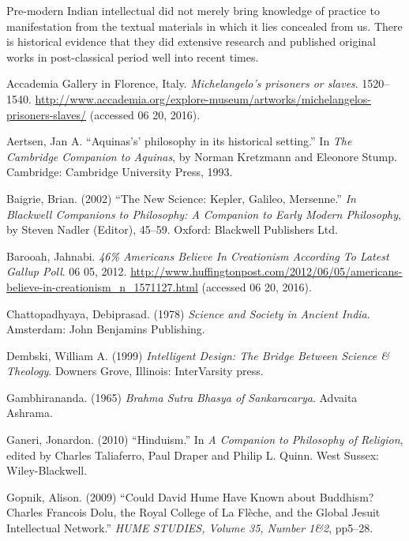 Pre-modern Indian intellectual did not merely bring knowledge of practice to manifestation from the textual materials in which it lies concealed from us. There is historical evidence that they did extensive research and published original works in post-classical period well into recent times.

\begin{thebibliography}{99}
\itemsep=2pt
Accademia Gallery in Florence, Italy. {\sl Michelangelo's prisoners or slaves}. 1520--1540. \url{http://www.accademia.org/explore-museum/artworks/michelangelos-prisoners-slaves/} (accessed 06 20, 2016).

Aertsen, Jan A. ``Aquinas's' philosophy in its historical setting.'' In {\sl The Cambridge Companion to Aquinas}, by Norman Kretzmann and Eleonore Stump. Cambridge: Cambridge University Press, 1993.

Baigrie, Brian. (2002) ``The New Science: Kepler, Galileo, Mersenne.'' {\sl In Blackwell Companions to Philosophy: A Companion to Early Modern Philosophy}, by Steven Nadler (Editor), 45--59. Oxford: Blackwell Publishers Ltd.

Barooah, Jahnabi. {\sl 46\% Americans Believe In Creationism According To Latest Gallup Poll}. 06 05, 2012. \url{http://www.huffingtonpost.com/2012/06/05/americans-believe-in-creationism_n_1571127.html} (accessed 06 20, 2016).

Chattopadhyaya, Debiprasad. (1978) {\sl Science and Society in Ancient India}. Amsterdam: John Benjamins Publishing.

Dembski, William A. (1999) {\sl Intelligent Design: The Bridge Between Science \& Theology}. Downers Grove, Illinois: InterVarsity press.

Gambhirananda. (1965) {\sl Brahma Sutra Bhasya of Sankaracarya}. Advaita Ashrama.

Ganeri, Jonardon. (2010) ``Hinduism.'' In {\sl A Companion to Philosophy of Religion}, edited by Charles Taliaferro, Paul Draper and Philip L. Quinn. West Sussex: Wiley-Blackwell.

Gopnik, Alison. (2009) ``Could David Hume Have Known about Buddhism? Charles Francois Dolu, the Royal College of La Flèche, and the Global Jesuit Intellectual Network.'' {\sl HUME STUDIES, Volume 35, Number 1\&2}, pp5--28.


\end{thebibliography}
